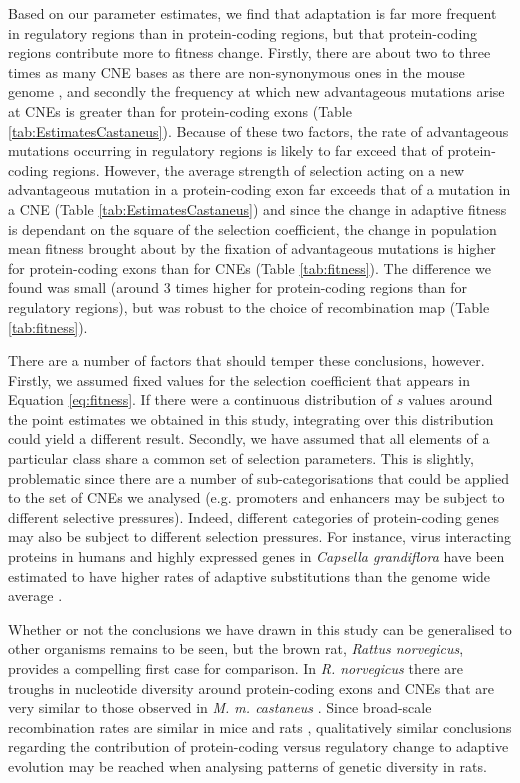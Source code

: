 {	Based on our parameter estimates, we find that adaptation is far more frequent in regulatory regions than in protein-coding regions, but that protein-coding regions contribute more to fitness change. Firstly, there are about two to three times as many CNE bases as there are non-synonymous ones in the mouse genome \citep{RN122}, and secondly the frequency at which new advantageous mutations arise at CNEs is greater than for protein-coding exons (Table \ref{tab:EstimatesCastaneus}). Because of these two factors, the rate of advantageous mutations occurring in regulatory regions is likely to far exceed that of protein-coding regions. However, the average strength of selection acting on a new advantageous mutation in a protein-coding exon far exceeds that of a mutation in a CNE (Table \ref{tab:EstimatesCastaneus}) and since the change in adaptive fitness is dependant on the square of the selection coefficient, the change in population mean fitness brought about by the fixation of advantageous mutations is higher for protein-coding exons than for CNEs (Table \ref{tab:fitness}). The difference we found was small (around 3 times higher for protein-coding regions than for regulatory regions), but was robust to the choice of recombination map (Table \ref{tab:fitness}). 

\linespread{1}

\linespread{2}

	There are a number of factors that should temper these conclusions, however. 	Firstly, we assumed fixed values for the selection coefficient that appears in Equation \ref{eq:fitness}. If there were a continuous distribution of $s$ values around the point estimates we obtained in this study, integrating over this distribution could yield a different result. Secondly, we have assumed that all elements of a particular class share a common set of selection parameters. This is slightly, problematic since there are a number of sub-categorisations that could be applied to the set of CNEs we analysed (e.g. promoters and enhancers may be subject to different selective pressures). Indeed, different categories of protein-coding genes may also be subject to different selection pressures. For instance, virus interacting proteins in humans and highly expressed genes in \textit{Capsella grandiflora} have been estimated to have higher rates of adaptive substitutions than the genome wide average \citep{RN236, RN777}.

	Whether or not the conclusions we have drawn in this study can be generalised to other organisms remains to be seen, but the brown rat, \textit{Rattus norvegicus}, provides a compelling first case for comparison. In \textit{R. norvegicus} there are troughs in nucleotide diversity around protein-coding exons and CNEs that are very similar to those observed in \textit{M. m. castaneus} \citep{RN327}. Since broad-scale recombination rates are similar in mice and rats \citep{RN184}, qualitatively similar conclusions regarding the contribution of protein-coding versus regulatory change to adaptive evolution may be reached when analysing patterns of genetic diversity in rats. 

}
